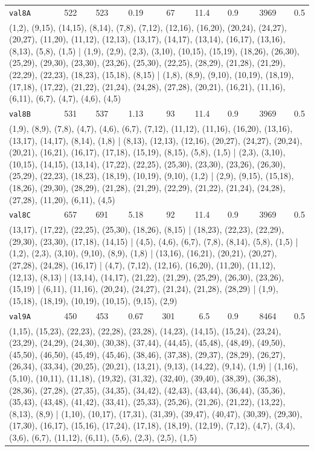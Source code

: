 \begin{landscape}
\begin{longtable}{lrrrrrrrr}
\texttt{val8A} & 522 & 523 & 0.19 & 67 & 11.4 & 0.9 & 3969 & 0.5 \\
\multicolumn{9}{p{0.96\linewidth}}{\tiny\raggedright\arraybackslash (1,2), (9,15), (14,15), (8,14), (7,8), (7,12), (12,16), (16,20), (20,24), (24,27), (20,27), (11,20), (11,12), (12,13), (13,17), (14,17), (13,14), (16,17), (13,16), (8,13), (5,8), (1,5) | (1,9), (2,9), (2,3), (3,10), (10,15), (15,19), (18,26), (26,30), (25,29), (29,30), (23,30), (23,26), (25,30), (22,25), (28,29), (21,28), (21,29), (22,29), (22,23), (18,23), (15,18), (8,15) | (1,8), (8,9), (9,10), (10,19), (18,19), (17,18), (17,22), (21,22), (21,24), (24,28), (27,28), (20,21), (16,21), (11,16), (6,11), (6,7), (4,7), (4,6), (4,5)} \\[2pt]
\texttt{val8B} & 531 & 537 & 1.13 & 93 & 11.4 & 0.9 & 3969 & 0.5 \\
\multicolumn{9}{p{0.96\linewidth}}{\tiny\raggedright\arraybackslash (1,9), (8,9), (7,8), (4,7), (4,6), (6,7), (7,12), (11,12), (11,16), (16,20), (13,16), (13,17), (14,17), (8,14), (1,8) | (8,13), (12,13), (12,16), (20,27), (24,27), (20,24), (20,21), (16,21), (16,17), (17,18), (15,19), (8,15), (5,8), (1,5) | (2,3), (3,10), (10,15), (14,15), (13,14), (17,22), (22,25), (25,30), (23,30), (23,26), (26,30), (25,29), (22,23), (18,23), (18,19), (10,19), (9,10), (1,2) | (2,9), (9,15), (15,18), (18,26), (29,30), (28,29), (21,28), (21,29), (22,29), (21,22), (21,24), (24,28), (27,28), (11,20), (6,11), (4,5)} \\[2pt]
\texttt{val8C} & 657 & 691 & 5.18 & 92 & 11.4 & 0.9 & 3969 & 0.5 \\
\multicolumn{9}{p{0.96\linewidth}}{\tiny\raggedright\arraybackslash (13,17), (17,22), (22,25), (25,30), (18,26), (8,15) | (18,23), (22,23), (22,29), (29,30), (23,30), (17,18), (14,15) | (4,5), (4,6), (6,7), (7,8), (8,14), (5,8), (1,5) | (1,2), (2,3), (3,10), (9,10), (8,9), (1,8) | (13,16), (16,21), (20,21), (20,27), (27,28), (24,28), (16,17) | (4,7), (7,12), (12,16), (16,20), (11,20), (11,12), (12,13), (8,13) | (13,14), (14,17), (21,22), (21,29), (25,29), (26,30), (23,26), (15,19) | (6,11), (11,16), (20,24), (24,27), (21,24), (21,28), (28,29) | (1,9), (15,18), (18,19), (10,19), (10,15), (9,15), (2,9)} \\[2pt]
\texttt{val9A} & 450 & 453 & 0.67 & 301 & 6.5 & 0.9 & 8464 & 0.5 \\
\multicolumn{9}{p{0.96\linewidth}}{\tiny\raggedright\arraybackslash (1,15), (15,23), (22,23), (22,28), (23,28), (14,23), (14,15), (15,24), (23,24), (23,29), (24,29), (24,30), (30,38), (37,44), (44,45), (45,48), (48,49), (49,50), (45,50), (46,50), (45,49), (45,46), (38,46), (37,38), (29,37), (28,29), (26,27), (26,34), (33,34), (20,25), (20,21), (13,21), (9,13), (14,22), (9,14), (1,9) | (1,16), (5,10), (10,11), (11,18), (19,32), (31,32), (32,40), (39,40), (38,39), (36,38), (28,36), (27,28), (27,35), (34,35), (34,42), (42,43), (43,44), (36,44), (35,36), (35,43), (43,48), (41,42), (33,41), (25,33), (25,26), (21,26), (21,22), (13,22), (8,13), (8,9) | (1,10), (10,17), (17,31), (31,39), (39,47), (40,47), (30,39), (29,30), (17,30), (16,17), (15,16), (17,24), (17,18), (18,19), (12,19), (7,12), (4,7), (3,4), (3,6), (6,7), (11,12), (6,11), (5,6), (2,3), (2,5), (1,5)} \\[2pt]

\end{longtable}
\end{landscape}
